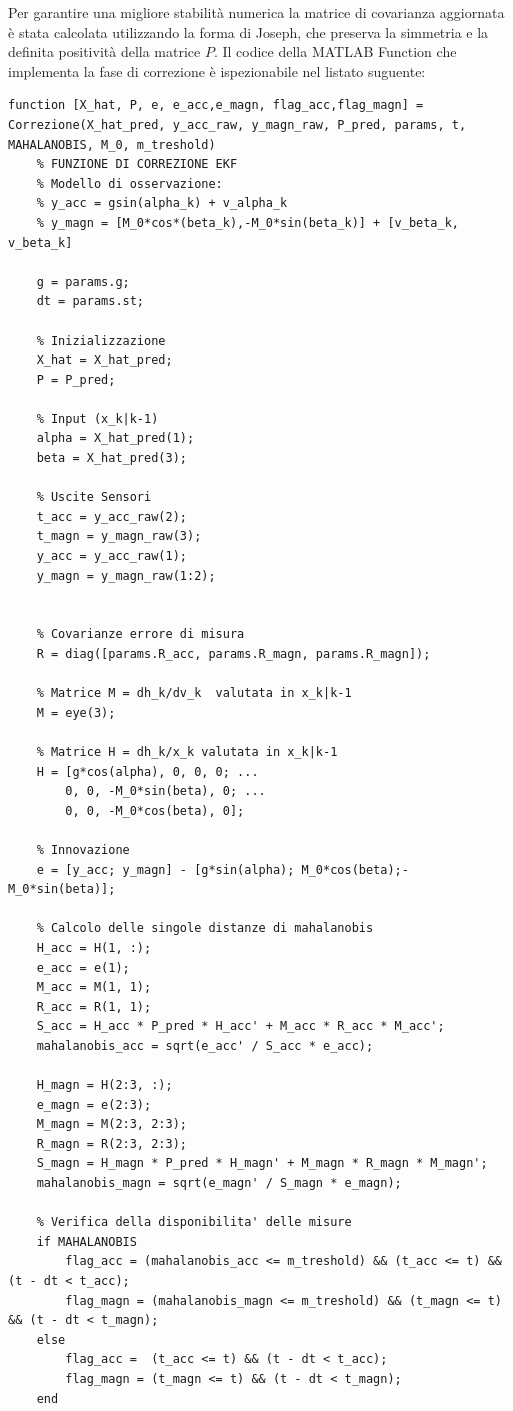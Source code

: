 \documentclass[12pt,a4paper]{article}
\begin{document}
Per garantire una migliore stabilità numerica la matrice di covarianza aggiornata è stata calcolata utilizzando la forma di Joseph,
che preserva la simmetria e la definita positività della matrice $P$.
Il codice della MATLAB Function che implementa la fase di correzione è ispezionabile nel listato suguente:
\newline
\begin{lstlisting}[style=matlabstyle, caption={Blocco di correzione dell'EKF}, label={lst:correzione_ekf}]
function [X_hat, P, e, e_acc,e_magn, flag_acc,flag_magn] = Correzione(X_hat_pred, y_acc_raw, y_magn_raw, P_pred, params, t, MAHALANOBIS, M_0, m_treshold)
    % FUNZIONE DI CORREZIONE EKF 
    % Modello di osservazione: 
    % y_acc = gsin(alpha_k) + v_alpha_k
    % y_magn = [M_0*cos*(beta_k),-M_0*sin(beta_k)] + [v_beta_k, v_beta_k]

    g = params.g;
    dt = params.st;

    % Inizializzazione
    X_hat = X_hat_pred;
    P = P_pred;
    
    % Input (x_k|k-1)
    alpha = X_hat_pred(1); 
    beta = X_hat_pred(3);

    % Uscite Sensori
    t_acc = y_acc_raw(2);
    t_magn = y_magn_raw(3);
    y_acc = y_acc_raw(1);
    y_magn = y_magn_raw(1:2);

      
    % Covarianze errore di misura
    R = diag([params.R_acc, params.R_magn, params.R_magn]);
    
    % Matrice M = dh_k/dv_k  valutata in x_k|k-1
    M = eye(3);

    % Matrice H = dh_k/x_k valutata in x_k|k-1
    H = [g*cos(alpha), 0, 0, 0; ...
        0, 0, -M_0*sin(beta), 0; ...
        0, 0, -M_0*cos(beta), 0];

    % Innovazione
    e = [y_acc; y_magn] - [g*sin(alpha); M_0*cos(beta);-M_0*sin(beta)];

    % Calcolo delle singole distanze di mahalanobis
    H_acc = H(1, :);
    e_acc = e(1);
    M_acc = M(1, 1);
    R_acc = R(1, 1);
    S_acc = H_acc * P_pred * H_acc' + M_acc * R_acc * M_acc';
    mahalanobis_acc = sqrt(e_acc' / S_acc * e_acc);

    H_magn = H(2:3, :);
    e_magn = e(2:3);
    M_magn = M(2:3, 2:3);
    R_magn = R(2:3, 2:3);
    S_magn = H_magn * P_pred * H_magn' + M_magn * R_magn * M_magn';
    mahalanobis_magn = sqrt(e_magn' / S_magn * e_magn);

    % Verifica della disponibilita' delle misure
    if MAHALANOBIS
        flag_acc = (mahalanobis_acc <= m_treshold) && (t_acc <= t) && (t - dt < t_acc);
        flag_magn = (mahalanobis_magn <= m_treshold) && (t_magn <= t) && (t - dt < t_magn);
    else
        flag_acc =  (t_acc <= t) && (t - dt < t_acc);
        flag_magn = (t_magn <= t) && (t - dt < t_magn);
    end


\end{lstlisting}
\end{document}
